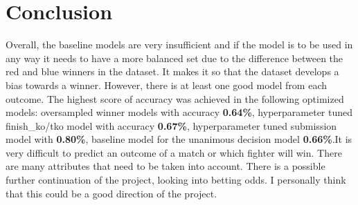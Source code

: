 \documentclass{article}
\begin{document}
\section{Conclusion}
Overall, the baseline models are very insufficient and if the model is to be used in any way it needs to have a more balanced set due to the difference between the red and blue winners in the dataset. It makes it so that the dataset develops a bias towards a winner. However, there is at least one good model from each outcome. The highest score of accuracy was achieved in the following optimized models: oversampled winner models with accuracy \textbf{0.64\%}, hyperparameter tuned finish\_ko/tko model with accuracy \textbf{0.67\%}, hyperparameter tuned submission model with \textbf{0.80\%}, baseline model for the unanimous decision model \textbf{0.66\%}.It is very difficult to predict an outcome of a match or which fighter will win. There are many attributes that need to be taken into account. There is a possible further continuation of the project, looking into betting odds. I personally think that this could be a good direction of the project.\\
\end{document}
